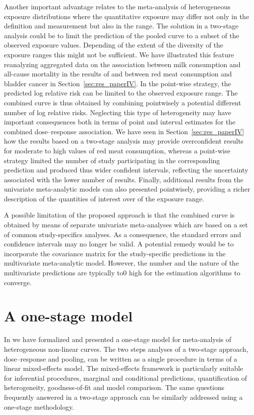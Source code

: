 \documentclass[11pt,a4paper,twoside,openany]{book}\usepackage{knitr}
\begin{document}
{Another important advantage relates to the meta-analysis of heterogeneous exposure distributions where the quantitative exposure may differ not only in the definition and measurement but also in the range. The solution in a two-stage analysis could be to limit the prediction of the pooled curve to a subset of the observed exposure values. Depending of the extent of the diversity of the exposure ranges this might not be sufficient. We have illustrated this feature reanalyzing aggregated data on the association between milk consumption and all-cause mortality in the results of  and between red meat consumption and bladder cancer in Section~\ref{sec:res_paperIV}. 
In the point-wise strategy, the predicted log relative risk can be limited to the observed exposure range. The combined curve is thus obtained by combining pointwisely a potential different number of log relative risks. Neglecting this type of heterogeneity may have important consequences both in terms of point and interval estimates for the combined dose--response association. We have seen in Section~\ref{sec:res_paperIV} how the results based on a two-stage analysis may provide overconfident results for moderate to high values of red meat consumption, whereas a point-wise strategy limited the number of study participating in the corresponding prediction and produced thus wider confident intervals, reflecting the uncertainty associated with the lower number of results. Finally, additional results from the univariate meta-analytic models can also presented pointwisely, providing a richer description of the quantities of interest over of the exposure range.

A possible limitation of the proposed approach is that the combined curve is obtained by means of separate univariate meta-analyses which are based on a set of common study-specifics analyses. As a consequence, the standard errors and confidence intervals may no longer be valid. A potential remedy would be to incorporate the covariance matrix for the study-specific predictions in the multivariate meta-analytic model. However, the number and the nature of the multivariate predictions are typically to0 high for the estimation algorithms to converge.


\section{A one-stage model}

In  we have formalized and presented a one-stage model for meta-analysis of heterogeneous non-linear curves. The two steps analyses of a two-stage approach, dose--response and pooling, can be written as a single procedure in terms of a linear mixed-effects model. The mixed-effects framework is particularly suitable for inferential procedures, marginal and conditional predictions, quantification of heterogeneity, goodness-of-fit and model comparison. The same questions frequently answered in a two-stage approach can be similarly addressed using a one-stage methodology. 

}
\end{document}
